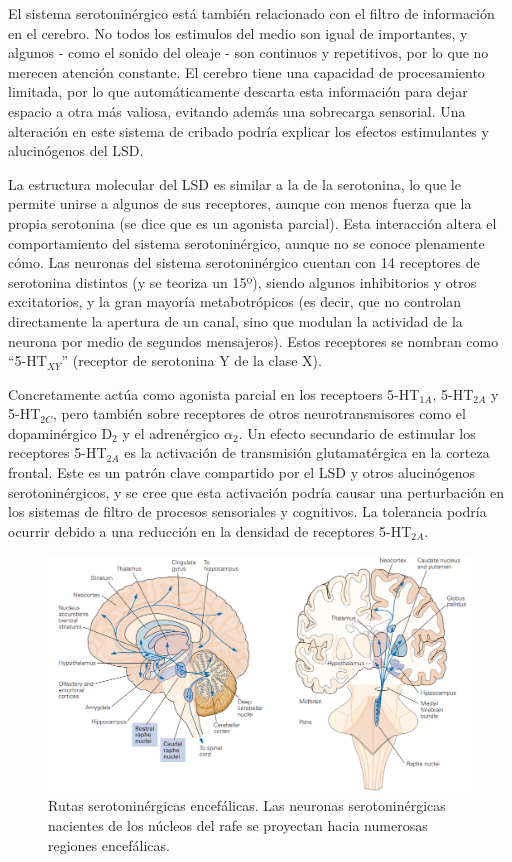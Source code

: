 El sistema serotoninérgico está también relacionado con el filtro de información en el cerebro. No todos los estimulos del medio son igual de importantes, y algunos - como el sonido del oleaje - son continuos y repetitivos, por lo que no merecen atención constante. El cerebro tiene una capacidad de procesamiento limitada, por lo que automáticamente descarta esta información para dejar espacio a otra más valiosa, evitando además una sobrecarga sensorial. Una alteración en este sistema de cribado podría explicar los efectos estimulantes y alucinógenos del LSD.

La estructura molecular del LSD es similar a la de la serotonina, lo que le permite unirse a algunos de sus receptores, aunque con menos fuerza que la propia serotonina (se dice que es un agonista parcial). Esta interacción altera el comportamiento del sistema serotoninérgico, aunque no se conoce plenamente cómo. Las neuronas del sistema serotoninérgico cuentan con 14 receptores de serotonina distintos (y se teoriza un 15º), siendo algunos inhibitorios y otros excitatorios, y la gran mayoría metabotrópicos (es decir, que no controlan directamente la apertura de un canal, sino que modulan la actividad de la neurona por medio de segundos mensajeros). Estos receptores se nombran como \enquote{5-HT$_{XY}$} (receptor de serotonina Y de la clase X).

Concretamente actúa como agonista parcial en los receptoers 5-HT$_{1A}$, 5-HT$_{2A}$ y 5-HT$_{2C}$, pero también sobre receptores de otros neurotransmisores como el dopaminérgico D$_2$ y el adrenérgico $\alpha_2$. Un efecto secundario de estimular los receptores 5-HT$_{2A}$ es la activación de transmisión glutamatérgica en la corteza frontal. Este es un patrón clave compartido por el LSD y otros alucinógenos serotoninérgicos, y se cree que esta activación podría causar una perturbación en los sistemas de filtro de procesos sensoriales y cognitivos. La tolerancia podría ocurrir debido a una reducción en la densidad de receptores 5-HT$_{2A}$.

\begin{figure}[H]
	\centering
	\includegraphics[width=\linewidth]{media/9-pathways.png}
	\caption{Rutas serotoninérgicas encefálicas. Las neuronas serotoninérgicas nacientes de los núcleos del rafe se proyectan hacia numerosas regiones encefálicas.}
	\label{pathways}
\end{figure}

\newpage
